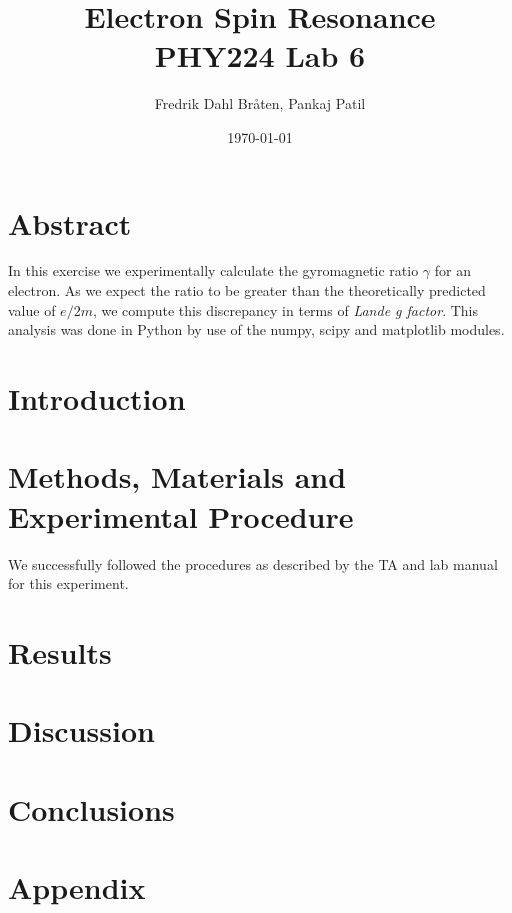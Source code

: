 \documentclass[letterpaper,12pt]{article}
\begin{document}
\title{%
Electron Spin Resonance \\
\large PHY224 Lab 6}
\author{Fredrik Dahl Bråten, Pankaj Patil}
\date{\today}
\maketitle

\section{Abstract}

In this exercise we experimentally calculate the gyromagnetic ratio $\gamma$ for an electron. 
As we expect the ratio to be greater than the theoretically predicted value of $e/2m$, 
we compute this discrepancy in terms of \emph{Lande g factor}. This analysis was done in Python by use of the numpy, scipy and matplotlib modules.

\section{Introduction}


\section{Methods, Materials and Experimental Procedure}

We successfully followed the procedures as described by the TA and lab manual \cite{lab-manual-ex6} for this experiment.

\section{Results}

\section{Discussion}

\section{Conclusions}

\pagebreak

\appendix

\section{Appendix}
\end{document}
